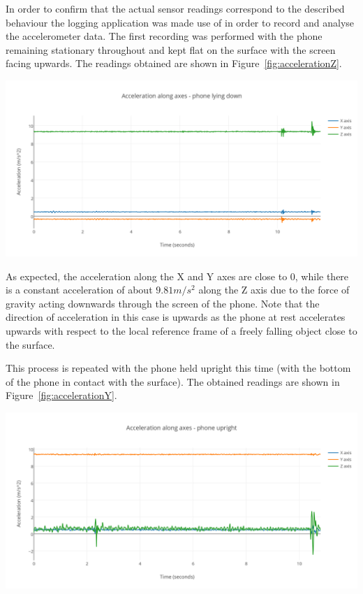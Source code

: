 \documentclass[main.tex]{subfiles}
\begin{document}
In order to confirm that the actual sensor readings correspond to the described behaviour the logging application was made use of in order to record and analyse the accelerometer data. The first recording was performed with the phone remaining stationary throughout and kept flat on the surface with the screen facing upwards. The readings obtained are shown in Figure~\ref{fig:accelerationZ}.

\begin{center}
\includegraphics[scale=0.9]{images/accelerationZ.png}
\label{fig:accelerationZ}
\end{center}

As expected, the acceleration along the X and Y axes are close to 0, while there is a constant acceleration of about $9.81 m/s^2$ along the Z axis due to the force of gravity acting downwards through the screen of the phone. Note that the direction of acceleration in this case is upwards as the phone at rest accelerates upwards with respect to the local reference frame of a freely falling object close to the surface. 

This process is repeated with the phone held upright this time (with the bottom of the phone in contact with the surface). The obtained readings are shown in Figure~\ref{fig:accelerationY}.

\begin{center}
\includegraphics[scale=0.9]{images/accelerationY.png}
\label{fig:accelerationY}
\end{center}
\end{document}
